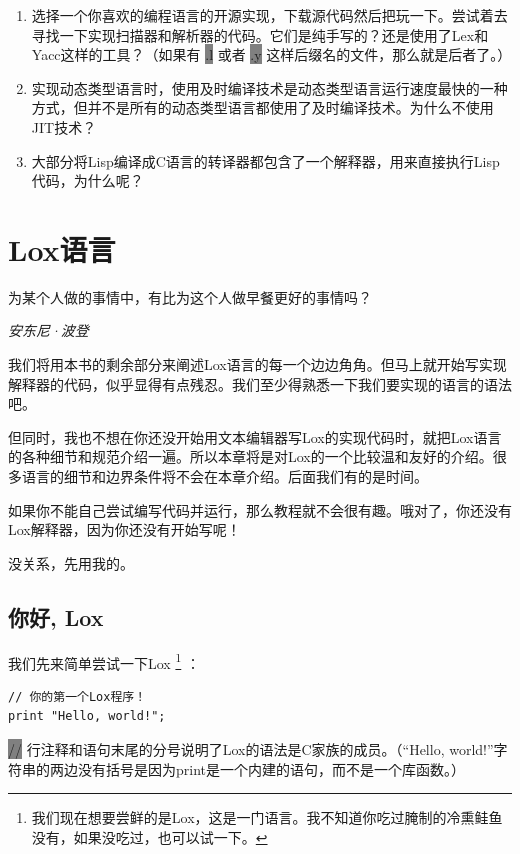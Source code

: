 \documentclass[cn,10pt,math=newtx,citestyle=gb7714-2015,bibstyle=gb7714-2015]{elegantbook}
\begin{document}
\begin{enumerate}
   \item 选择一个你喜欢的编程语言的开源实现，下载源代码然后把玩一下。尝试着去寻找一下实现扫描器和解析器的代码。它们是纯手写的？还是使用了Lex和Yacc这样的工具？（如果有 \colorbox{gray}{.l} 或者 \colorbox{gray}{.y} 这样后缀名的文件，那么就是后者了。）
   \item 实现动态类型语言时，使用及时编译技术是动态类型语言运行速度最快的一种方式，但并不是所有的动态类型语言都使用了及时编译技术。为什么不使用JIT技术？
   \item 大部分将Lisp编译成C语言的转译器都包含了一个解释器，用来直接执行Lisp代码，为什么呢？
\end{enumerate}

\chapter{Lox语言}

\epigraph{为某个人做的事情中，有比为这个人做早餐更好的事情吗？}{\textit{安东尼·波登}}

我们将用本书的剩余部分来阐述Lox语言的每一个边边角角。但马上就开始写实现解释器的代码，似乎显得有点残忍。我们至少得熟悉一下我们要实现的语言的语法吧。

但同时，我也不想在你还没开始用文本编辑器写Lox的实现代码时，就把Lox语言的各种细节和规范介绍一遍。所以本章将是对Lox的一个比较温和友好的介绍。很多语言的细节和边界条件将不会在本章介绍。后面我们有的是时间。

\begin{tcolorbox}
如果你不能自己尝试编写代码并运行，那么教程就不会很有趣。哦对了，你还没有Lox解释器，因为你还没有开始写呢！

没关系，先用我的。
\end{tcolorbox}

\section{你好, Lox}

我们先来简单尝试一下Lox \footnote{我们现在想要尝鲜的是Lox，这是一门语言。我不知道你吃过腌制的冷熏鲑鱼没有，如果没吃过，也可以试一下。} ： 

\begin{verbatim}
// 你的第一个Lox程序！
print "Hello, world!";
\end{verbatim}

\colorbox{gray}{//} 行注释和语句末尾的分号说明了Lox的语法是C家族的成员。（“Hello, world!”字符串的两边没有括号是因为print是一个内建的语句，而不是一个库函数。）
\end{document}
